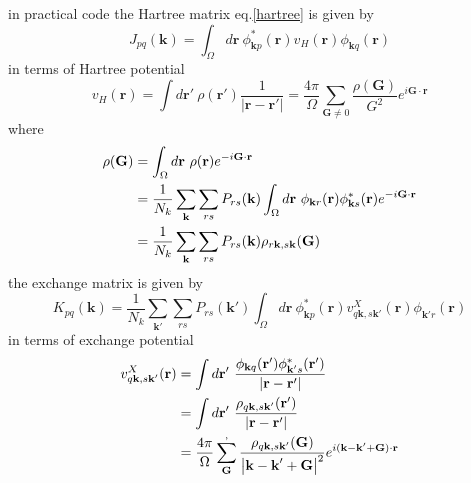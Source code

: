\documentclass{article}
\begin{document}
            in practical code the Hartree matrix eq.\eqref{hartree} is given by
            \begin{equation}
                J_{pq}(\textbf{k}) = \int_{\Omega}d\textbf{r}\ \phi_{\textbf{k}p}^*(\textbf{r})
                v_H(\textbf{r})\phi_{\textbf{k}q}(\textbf{r})\label{hartree_code}
            \end{equation}
            in terms of Hartree potential
            \begin{equation}
                v_H(\textbf{r}) = \int d\textbf{r}'\ \rho(\textbf{r}')\frac{1}{\left|\textbf{r}-\textbf{r}'\right|} 
                = \frac{4\pi}{\Omega}\sum_{\textbf{G}\neq 0}\frac{\rho(\textbf{G})}{G^2}e^{i\textbf{G}\cdot\textbf{r}}
            \end{equation}
            where
            \begin{align}
                \rho(\textbf{G}) &= \int_{\Omega}d\textbf{r}\ \rho(\textbf{r})e^{-i\textbf{G}\cdot\textbf{r}}\notag\\
                &= \frac{1}{N_k}\sum_{\textbf{k}}\sum_{rs}P_{rs}(\textbf{k})\int_{\Omega}d\textbf{r}\ 
                    \phi_{\textbf{k}r}(\textbf{r})\phi_{\textbf{k}s}^*(\textbf{r})e^{-i\textbf{G}\cdot\textbf{r}}\notag\\
                &= \frac{1}{N_k}\sum_{\textbf{k}}\sum_{rs}P_{rs}(\textbf{k})\rho_{r\textbf{k},s\textbf{k}}(\textbf{G})
            \end{align}
            the exchange matrix is given by
            \begin{equation}
                K_{pq}(\textbf{k}) = \frac{1}{N_k}\sum_{\textbf{k}'}\sum_{rs}P_{rs}(\textbf{k}')\int_{\Omega} d\textbf{r}\ 
                \phi_{\textbf{k}p}^*(\textbf{r})v_{q\textbf{k},s\textbf{k}'}^X(\textbf{r})\phi_{\textbf{k}'r}(\textbf{r})
            \end{equation}
            in terms of exchange potential
            \begin{align}
                v_{q\textbf{k},s\textbf{k}'}^X(\textbf{r}) 
                &= \int d\textbf{r}'\ \frac{\phi_{\textbf{k}q}(\textbf{r}')
                    \phi_{\textbf{k}'s}^*(\textbf{r}')}{\left|\textbf{r}-\textbf{r}'\right|}\notag\\
                &= \int d\textbf{r}'\ \frac{\rho_{q\textbf{k},s\textbf{k}'}(\textbf{r}')}{\left|\textbf{r}-\textbf{r}'\right|}\notag \\
                &= \frac{4\pi}{\Omega}\sum_{\textbf{G}}^{,}\frac{\rho_{q\textbf{k},s\textbf{k}'}(\textbf{G})}
                    {\left|\textbf{k}-\textbf{k}'+\textbf{G}\right|^2}e^{i(\textbf{k}-\textbf{k}'+\textbf{G})\cdot\textbf{r}}
            \end{align}
\end{document}
